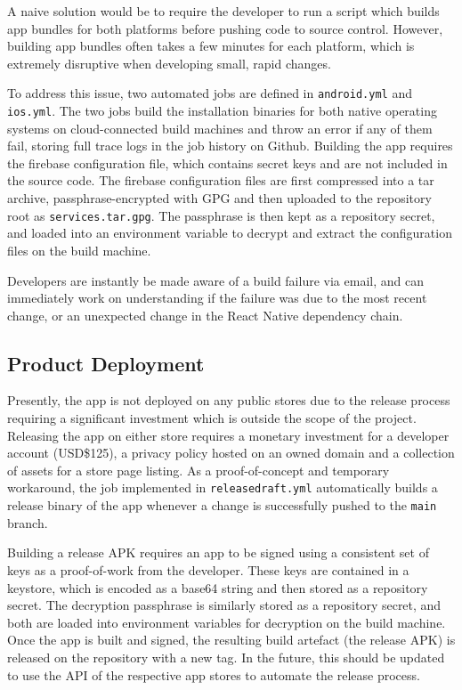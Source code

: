 A naive solution would be to require the developer to run a script which builds app bundles for both platforms before pushing code to source control. However, building app bundles often takes a few minutes for each platform, which is extremely disruptive when developing small, rapid changes.

To address this issue, two automated jobs are defined in \texttt{android.yml} and \texttt{ios.yml}. The two jobs build the installation binaries for both native operating systems on cloud-connected build machines and throw an error if any of them fail, storing full trace logs in the job history on Github. Building the app requires the firebase configuration file, which contains secret keys and are not included in the source code. The firebase configuration files are first compressed into a tar archive, passphrase-encrypted with GPG and then uploaded to the repository root as \texttt{services.tar.gpg}. The passphrase is then kept as a repository secret, and loaded into an environment variable to decrypt and extract the configuration files on the build machine.

Developers are instantly be made aware of a build failure via email, and can immediately work on understanding if the failure was due to the most recent change, or an unexpected change in the React Native dependency chain.

\subsection{Product Deployment}
Presently, the app is not deployed on any public stores due to the release process requiring a significant investment which is outside the scope of the project. Releasing the app on either store requires a monetary investment for a developer account (USD\$125), a privacy policy hosted on an owned domain and a collection of assets for a store page listing. As a proof-of-concept and temporary workaround, the job implemented in \texttt{releasedraft.yml} automatically builds a release binary of the app whenever a change is successfully pushed to the \texttt{main} branch.

Building a release APK requires an app to be signed using a consistent set of keys as a proof-of-work from the developer. These keys are contained in a keystore, which is encoded as a base64 string and then stored as a repository secret. The decryption passphrase is similarly stored as a repository secret, and both are loaded into environment variables for decryption on the build machine. Once the app is built and signed, the resulting build artefact (the release APK) is released on the repository with a new tag. In the future, this should be updated to use the API of the respective app stores to automate the release process.

